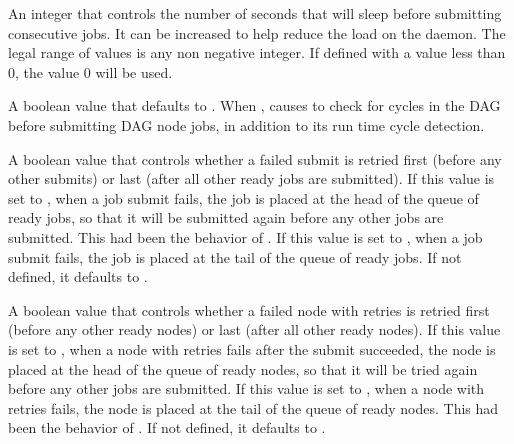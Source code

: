 \begin{description}
\label{param:DAGManSubmitDelay}
\item[\Macro{DAGMAN\_SUBMIT\_DELAY}]
  An integer that controls the number of seconds that 
  will sleep before submitting consecutive jobs.  It can be increased to
  help reduce the load on the  daemon.  The legal range
  of values is any non negative integer.  If defined with a value less
  than 0, the value 0 will be used.

\label{param:DAGManStartupCycleDetect}
\item[\Macro{DAGMAN\_STARTUP\_CYCLE\_DETECT}]
  A boolean value that defaults to .
  When ,
  causes  to check for cycles in the DAG before
  submitting DAG node jobs,
  in addition to its run time cycle detection.

\label{param:DAGManRetrySubmitFirst}
\item[\Macro{DAGMAN\_RETRY\_SUBMIT\_FIRST}]
  A boolean value that controls whether a failed submit is retried first
  (before any other submits) or last (after all other ready jobs are
  submitted).  If this value is set to , when a job submit
  fails, the job is placed at the head of the queue of ready jobs, so
  that it will be submitted again before any other jobs are submitted.
  This had been the behavior of .
  If this value is set to , when a job submit fails, the job
  is placed at the tail of the queue of ready jobs.
  If not defined, it defaults to .

\label{param:DAGManRetryNodeFirst}
\item[\Macro{DAGMAN\_RETRY\_NODE\_FIRST}]
  A boolean value that controls whether a failed node with retries
  is retried first (before any other ready nodes) or last (after all
  other ready nodes).  If this value is set to , when a
  node with retries fails after the submit succeeded, the node is
  placed at the head of the queue of ready nodes, so that it will be
  tried again before any other jobs are submitted.  If this value is
  set to , when a node with retries fails, the node
  is placed at the tail of the queue of ready nodes.
  This had been the behavior of .
  If not defined, it defaults to .


\end{description}
